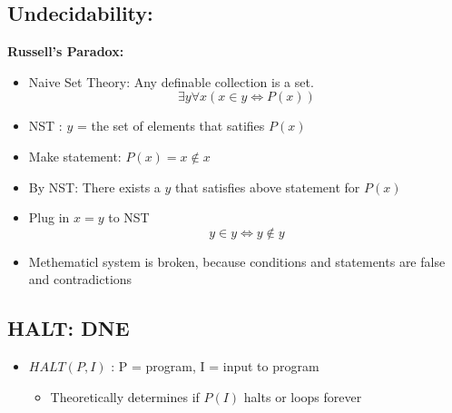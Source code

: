 \documentclass{article}\usepackage{amsmath,amssymb,amsthm,tikz,tkz-graph,color,chngpage,soul,hyperref,csquotes,graphicx,floatrow, listings}\newcommand*{\QEDB}{\hfill\ensuremath{\square}}\newtheorem*{prop}{Proposition}\renewcommand{\theenumi}{\alph{enumi}}\usepackage[shortlabels]{enumitem}\usepackage[nobreak=true]{mdframed}\usetikzlibrary{matrix,calc}\MakeOuterQuote{"}\usepackage[margin=0.75in]{geometry} \newtheorem{theorem}{Theorem}\newcommand{\Z}{\mathbb Z}\newcommand{\R}{\mathbb R}\newcommand{\Q}{\mathbb Q}\newcommand{\N}{\mathbb N}
\begin{document}
\subsection*{Undecidability:}
\begin{mdframed}
\textbf{Russell's Paradox:}
    \begin{itemize}
        \item Naive Set Theory: Any definable collection is a set.
        \begin{equation}\exists y\forall x(x \in y \iff P(x))\end{equation}
        \item NST : $y$ = the set of elements that satifies $P(x)$
        \item Make statement: $P(x) = x \not\in x$
        \item By NST: There exists a $y$ that satisfies above statement for $P(x)$
        \item Plug in $x = y$ to NST
        \begin{equation}y \in y \iff y \not\in y\end{equation}
        \item Methematicl system is broken, because conditions and statements are false and contradictions
    \end{itemize}
\end{mdframed}

\subsection*{HALT: DNE}
\begin{itemize}
    \item $HALT(P,I)$ : P = program, I = input to program
    \begin{itemize}
        \item Theoretically determines if $P(I)$ halts or loops forever
    \end{itemize}
\end{itemize}
\end{document}
